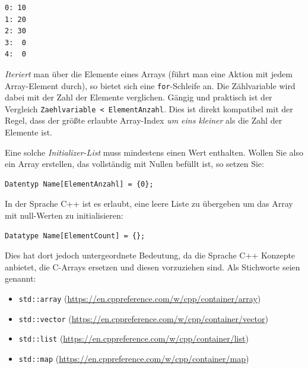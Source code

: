 \begin{cmdbox}
\begin{verbatim}
0: 10
1: 20
2: 30
3:  0
4:  0
\end{verbatim}
\end{cmdbox}

\begin{hintbox}
\emph{Iteriert} man über die Elemente eines Arrays (\ie führt man eine Aktion mit jedem Array-Element durch), so bietet sich eine \texttt{for}-Schleife an. Die Zählvariable wird dabei mit der Zahl der Elemente verglichen. Gängig und praktisch ist der Vergleich \texttt{Zaehlvariable < ElementAnzahl}. Dies ist direkt kompatibel mit der Regel, dass der größte erlaubte Array-Index \emph{um eins kleiner} als die Zahl der Elemente ist.
\end{hintbox}

Eine solche \emph{Initializer-List} muss mindestens einen Wert enthalten. Wollen Sie also ein Array erstellen, das vollständig mit Nullen befüllt ist, so setzen Sie:

\begin{codebox}
\begin{verbatim}
Datentyp Name[ElementAnzahl] = {0};
\end{verbatim}
\end{codebox}

\begin{plusbox}
In der Sprache C++ ist es erlaubt, eine leere Liste zu übergeben um das Array mit null-Werten zu initialisieren:

\vspace{5pt}
\begin{codebox}
\begin{verbatim}
Datatype Name[ElementCount] = {};
\end{verbatim}
\end{codebox}

Dies hat dort jedoch untergeordnete Bedeutung, da die Sprache C++ Konzepte anbietet, die C-Arrays ersetzen und diesen vorzuziehen sind. Als Stichworte seien genannt:
\begin{itemize}
\item \texttt{std::array}  (\url{https://en.cppreference.com/w/cpp/container/array})
\item \texttt{std::vector} (\url{https://en.cppreference.com/w/cpp/container/vector})
\item \texttt{std::list}   (\url{https://en.cppreference.com/w/cpp/container/list})
\item \texttt{std::map}    (\url{https://en.cppreference.com/w/cpp/container/map})
\end{itemize}
\end{plusbox}

